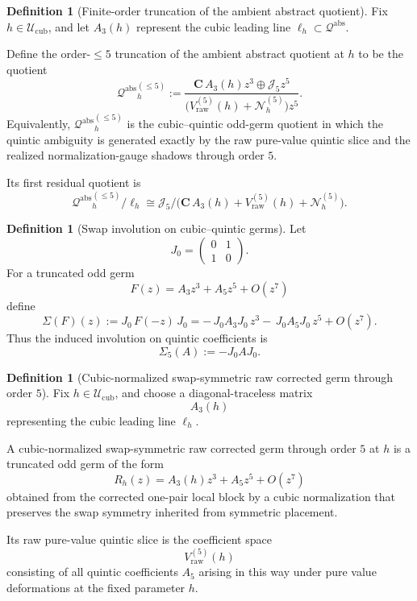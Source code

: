 \documentclass[11pt,a4paper]{amsart}
\theoremstyle{plain}
\theoremstyle{definition}
\newtheorem{definition}[theorem]{Definition}
\newcommand{\Qabs}{\mathcal Q^{\mathrm{abs}}}
\begin{document}
\begin{definition}[Finite-order truncation of the ambient abstract quotient]
\label{def:qabs-order-five}
Fix $h\in \mathcal U_{\mathrm{cub}}$, and let $A_3(h)$ represent the cubic
leading line $\ell_h\subset \Qabs$.

Define the order-$\le 5$ truncation of the ambient abstract quotient at $h$
to be the quotient
\[
{\Qabs}_h^{(\le 5)}
:=
\frac{\mathbf C\,A_3(h)z^3\oplus \mathcal J_5 z^5}
{\bigl(V_{\mathrm{raw}}^{(5)}(h)+\mathcal N_h^{(5)}\bigr)z^5}.
\]
Equivalently, ${\Qabs}_h^{(\le 5)}$ is the cubic--quintic odd-germ quotient in
which the quintic ambiguity is generated exactly by the raw pure-value quintic
slice and the realized normalization-gauge shadows through order $5$.

Its first residual quotient is
\[
{\Qabs}_h^{(\le 5)}/\ell_h
\cong
\mathcal J_5/
\bigl(\mathbf C\,A_3(h)+V_{\mathrm{raw}}^{(5)}(h)+\mathcal N_h^{(5)}\bigr).
\]
\end{definition}

\begin{definition}[Swap involution on cubic--quintic germs]
\label{def:sigma-cubic-quintic}
Let
\[
J_0=
\begin{pmatrix}
0&1\\
1&0
\end{pmatrix}.
\]
For a truncated odd germ
\[
F(z)=A_3 z^3+A_5 z^5+O(z^7)
\]
define
\[
\Sigma(F)(z):=J_0\,F(-z)\,J_0
=
-\,J_0A_3J_0\,z^3
-\,J_0A_5J_0\,z^5
+O(z^7).
\]
Thus the induced involution on quintic coefficients is
\[
\Sigma_5(A):=-J_0AJ_0.
\]
\end{definition}

\begin{definition}[Cubic-normalized swap-symmetric raw corrected germ through order $5$]
\label{def:raw-corrected-germ-order-five}
Fix $h\in \mathcal U_{\mathrm{cub}}$, and choose a diagonal-traceless
matrix
\[
A_3(h)
\]
representing the cubic leading line $\ell_h$.

A cubic-normalized swap-symmetric raw corrected germ through order $5$ at
$h$ is a truncated odd germ of the form
\[
R_h(z)=A_3(h)z^3+A_5 z^5+O(z^7)
\]
obtained from the corrected one-pair local block by a cubic normalization that
preserves the swap symmetry inherited from symmetric placement.

Its raw pure-value quintic slice is the coefficient space
\[
V_{\mathrm{raw}}^{(5)}(h)
\]
consisting of all quintic coefficients $A_5$ arising in this way under pure
value deformations at the fixed parameter $h$.
\end{definition}
\end{document}
